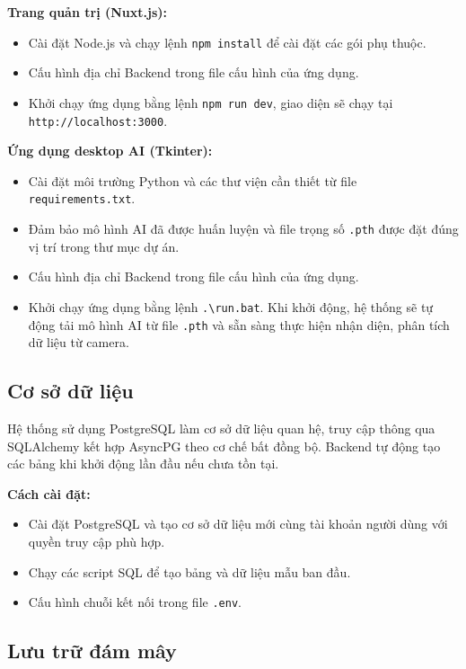 \textbf{Trang quản trị (Nuxt.js):}
\begin{itemize}
\item Cài đặt Node.js và chạy lệnh \texttt{npm install} để cài đặt các gói phụ thuộc.
\item Cấu hình địa chỉ Backend trong file cấu hình của ứng dụng.
\item Khởi chạy ứng dụng bằng lệnh \texttt{npm run dev}, giao diện sẽ chạy tại
\texttt{http://localhost:3000}.
\end{itemize}

\textbf{Ứng dụng desktop AI (Tkinter):}
\begin{itemize}
\item Cài đặt môi trường Python và các thư viện cần thiết từ file
\texttt{requirements.txt}.
\item Đảm bảo mô hình AI đã được huấn luyện và file trọng số
\texttt{.pth} được đặt đúng vị trí trong thư mục dự án.
\item Cấu hình địa chỉ Backend trong file cấu hình của ứng dụng.
\item Khởi chạy ứng dụng bằng lệnh \texttt{.\textbackslash run.bat}.
Khi khởi động, hệ thống sẽ tự động tải mô hình AI từ file
\texttt{.pth} và sẵn sàng thực hiện nhận diện, phân tích dữ liệu
từ camera.
\end{itemize}

\subsection{Cơ sở dữ liệu}

Hệ thống sử dụng PostgreSQL làm cơ sở dữ liệu quan hệ, truy cập thông qua SQLAlchemy kết hợp
AsyncPG theo cơ chế bất đồng bộ. Backend tự động tạo các bảng khi khởi động lần đầu nếu chưa tồn tại.

\noindent\textbf{Cách cài đặt:}
\begin{itemize}
\item Cài đặt PostgreSQL và tạo cơ sở dữ liệu mới cùng tài khoản người dùng với quyền truy cập phù hợp.
\item Chạy các script SQL để tạo bảng và dữ liệu mẫu ban đầu.
\item Cấu hình chuỗi kết nối trong file \texttt{.env}.
\end{itemize}

\subsection{Lưu trữ đám mây}

